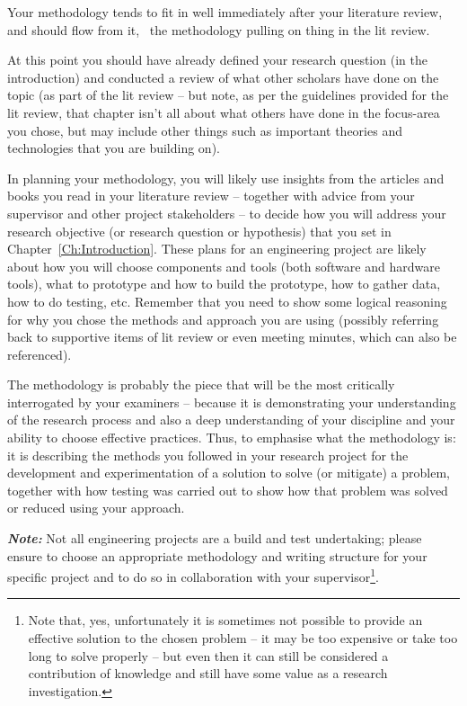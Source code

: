 \label{Ch:Methodology}

Your methodology tends to fit in well immediately after your literature review, and should flow from it, \eg~the methodology pulling on thing in the lit review.

At this point you should have already defined your research question (in the introduction) and conducted a review of what other scholars have done on the topic (as part of the lit review -- but note, as per the guidelines provided for the lit review, that chapter isn't all about what others have done in the focus-area you chose, but may include other things such as important theories and technologies that you are building on). 

In planning your methodology, you will likely use insights from the articles and books you read in your literature review -- together with advice from your supervisor and other project stakeholders -- to decide how you will address your research objective (or research question or hypothesis) that you set in Chapter~\ref{Ch:Introduction}. These plans for an engineering project are likely about how you will choose components and tools (both software and hardware tools), what to prototype and how to build the prototype, how to gather data, how to do testing, etc.  Remember that you need to show some logical reasoning for why you chose the methods and approach you are using (possibly referring back to supportive items of lit review or even meeting minutes, which can also be referenced).

The methodology is probably the piece that will be the most critically interrogated by your examiners -- because it is demonstrating your understanding of the research process and also a deep understanding of your discipline and your ability to choose effective practices.  Thus, to emphasise what the methodology is: it is describing the methods you followed in your research project for the development and experimentation of a solution to solve (or mitigate) a problem, together with how testing was carried out to show how that problem was solved or reduced using your approach.

\textbf{\textit{Note:}} Not all engineering projects are a build and test undertaking; please ensure to choose an appropriate methodology and writing structure for your specific project and to do so in collaboration with your supervisor\footnote{Note that, yes, unfortunately it is sometimes not possible to provide an effective solution to the chosen problem -- it may be too expensive or take too long to solve properly -- but even then it can still be considered a contribution of knowledge and still have some value as a research investigation.}.

